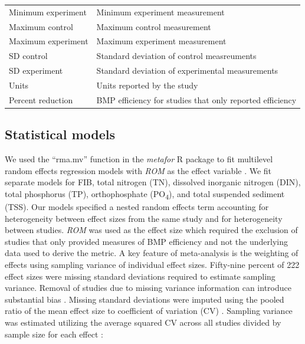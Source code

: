 \documentclass[utf8]{FrontiersinHarvard}
\begin{document}
\begin{table}
\begin{tabular}[t]{>{\raggedright\arraybackslash}p{10em}>{\raggedright\arraybackslash}p{25em}}
Minimum experiment & Minimum experiment measurement\\
Maximum control & Maximum control measurement\\
Maximum experiment & Maximum experiment measurement\\
\addlinespace
SD control & Standard deviation of control measreuments\\
SD experiment & Standard deviation of experimental measurements\\
Units & Units reported by the study\\
Percent reduction & BMP efficiency for studies that only reported efficiency\\
\bottomrule
\end{tabular}
\end{table}

\hypertarget{statistical-models}{%
\subsection{Statistical models}\label{statistical-models}}

We used the ``rma.mv'' function in the \emph{metafor} R package to fit multilevel random effects regression models with \emph{ROM} as the effect variable \citep{viechtbauerConductingMetaanalysesMetafor2010, rcoreteamLanguageEnvironmentStatistical2023}.
We fit separate models for FIB, total nitrogen (TN), dissolved inorganic nitrogen (DIN), total phosphorus (TP), orthophosphate (PO\textsubscript{4}), and total suspended sediment (TSS).
Our models specified a nested random effects term accounting for heterogeneity between effect sizes from the same study and for heterogeneity between studies.
\emph{ROM} was used as the effect size which required the exclusion of studies that only provided measures of BMP efficiency and not the underlying data used to derive the metric.
A key feature of meta-analysis is the weighting of effects using sampling variance of individual effect sizes.
Fifty-nine percent of 222 effect sizes were missing standard deviations required to estimate sampling variance.
Removal of studies due to missing variance information can introduce substantial bias \citep{kambachConsequencesMultipleImputation2020}.
Missing standard deviations were imputed using the pooled ratio of the mean effect size to coefficient of variation (CV) \citep{brackenStatisticalMethodsAnalysis1992}.
Sampling variance was estimated utilizing the average squared CV across all studies divided by sample size for each effect \citep{nakagawaRobustReadilyImplementable2023, doncasterCorrectionBiasMeta2018}:
\end{document}
